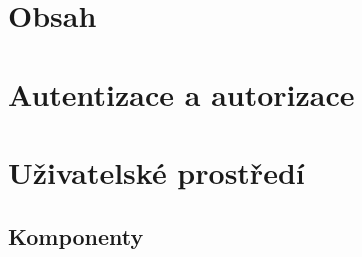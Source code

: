 \section{Obsah}\label{text:navrh/obsah}

\section{Autentizace a autorizace}\label{text:navrh/auth}

\section{Uživatelské prostředí}

\subsection{Komponenty}

